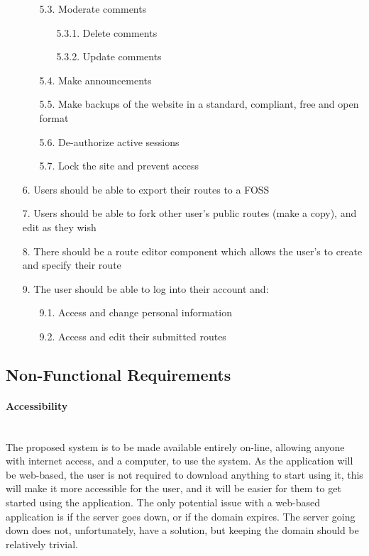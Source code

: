 \begin{enumerate}
\begin{enumerate}
 		\item[5.3.] Moderate comments
 		\begin{enumerate}
 			\item[5.3.1.] Delete comments
			\item[5.3.2.] Update comments
 		\end{enumerate}
 		\item[5.4.] Make announcements
 		\item[5.5.] Make backups of the website in a standard, compliant, free and open format
 		\item[5.6.] De-authorize active sessions
 		\item[5.7.] Lock the site and prevent access
 	\end{enumerate}
 \item[6.] Users should be able to export their routes to a FOSS
 \item[7.] Users should be able to fork other user's public routes (make a copy), and edit as they wish
 \item[8.] There should be a route editor component which allows the user's to create and specify their route
 \item[9.] The user should be able to log into their account and:
	 \begin{enumerate}
	 	\item[9.1.] Access and change personal information
	  	\item[9.2.] Access and edit their submitted routes
	 \end{enumerate}
 \end{enumerate}
 
 
 \subsection{Non-Functional Requirements}

\paragraph{Accessibility}\ \\
The proposed system is to be made available entirely on-line, allowing anyone with internet access, and a computer, to use the system. As the application will be web-based, the user is not required to download anything to start using it, this will make it more accessible for the user, and it will be easier for them to get started using the application. The only potential issue with a web-based application is if the server goes down, or if the domain expires. The server going down does not, unfortunately, have a solution, but keeping the domain should be relatively trivial.

